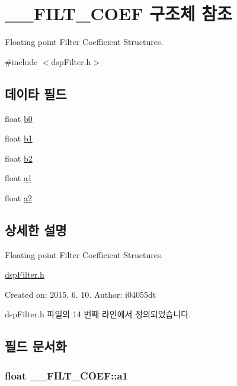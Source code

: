 \hypertarget{struct_____f_i_l_t___c_o_e_f}{\section{\+\_\+\+\_\+\+F\+I\+L\+T\+\_\+\+C\+O\+E\+F 구조체 참조}
\label{struct_____f_i_l_t___c_o_e_f}
}


Floating point Filter Coefficient Structures.  




{\ttfamily \#include $<$dsp\+Filter.\+h$>$}

\subsection*{데이타 필드}
\begin{DoxyCompactItemize}
\item 
float \hyperlink{struct_____f_i_l_t___c_o_e_f_ab7a4e5aa04e332119f7ed50b2fdf55bc}{b0}
\item 
float \hyperlink{struct_____f_i_l_t___c_o_e_f_a6b091370c641032308e29256f8ed3ea1}{b1}
\item 
float \hyperlink{struct_____f_i_l_t___c_o_e_f_a5d1f0db7785187119dbdd01681d9d230}{b2}
\item 
float \hyperlink{struct_____f_i_l_t___c_o_e_f_a0a8a4d4cc79f407d2123b75794233cd8}{a1}
\item 
float \hyperlink{struct_____f_i_l_t___c_o_e_f_aeb8fe784561c14b524f8d8527c723b2c}{a2}
\end{DoxyCompactItemize}


\subsection{상세한 설명}
Floating point Filter Coefficient Structures. 

\hyperlink{dsp_filter_8h}{dsp\+Filter.\+h}

Created on\+: 2015. 6. 10. Author\+: i04055dt 

dsp\+Filter.\+h 파일의 14 번째 라인에서 정의되었습니다.



\subsection{필드 문서화}
\hypertarget{struct_____f_i_l_t___c_o_e_f_a0a8a4d4cc79f407d2123b75794233cd8}{
\subsubsection[{a1}]{\setlength{\rightskip}{0pt plus 5cm}float \+\_\+\+\_\+\+F\+I\+L\+T\+\_\+\+C\+O\+E\+F\+::a1}}\label{struct_____f_i_l_t___c_o_e_f_a0a8a4d4cc79f407d2123b75794233cd8}


